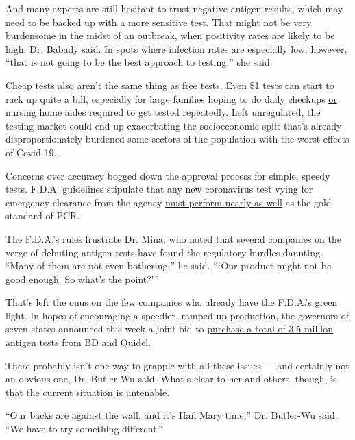 And many experts are still hesitant to trust negative antigen results,
which may need to be backed up with a more sensitive test. That might
not be very burdensome in the midst of an outbreak, when positivity
rates are likely to be high, Dr. Babady said. In spots where infection
rates are especially low, however, ``that is not going to be the best
approach to testing,'' she said.

Cheap tests also aren't the same thing as free tests. Even \$1 tests can
start to rack up quite a bill, especially for large families hoping to
do daily checkups
\href{https://www.nytimes3xbfgragh.onion/2020/06/09/health/testing-coronavirus-nursing-homes-workers.html}{or
nursing home aides required to get tested repeatedly.} Left unregulated,
the testing market could end up exacerbating the socioeconomic split
that's already disproportionately burdened some sectors of the
population with the worst effects of Covid-19.

Concerns over accuracy bogged down the approval process for simple,
speedy tests. F.D.A. guidelines stipulate that any new coronavirus test
vying for emergency clearance from the agency
\href{https://www.fda.gov/news-events/press-announcements/coronavirus-covid-19-update-fda-posts-new-template-home-and-over-counter-diagnostic-tests-use-non}{must
perform nearly as well} as the gold standard of PCR.

The F.D.A.'s rules frustrate Dr. Mina, who noted that several companies
on the verge of debuting antigen tests have found the regulatory hurdles
daunting. ``Many of them are not even bothering,'' he said. ```Our
product might not be good enough. So what's the point?'''

That's left the onus on the few companies who already have the F.D.A.'s
green light. In hopes of encouraging a speedier, ramped up production,
the governors of seven states announced this week a joint bid to
\href{https://governor.maryland.gov/2020/08/04/governors-of-maryland-louisiana-massachusetts-michigan-ohio-and-virginia-announce-major-bipartisan-interstate-compact-for-three-million-rapid-antigen-tests/}{purchase
a total of 3.5 million antigen tests from BD and Quidel}.

There probably isn't one way to grapple with all these issues --- and
certainly not an obvious one, Dr. Butler-Wu said. What's clear to her
and others, though, is that the current situation is untenable.

``Our backs are against the wall, and it's Hail Mary time,'' Dr.
Butler-Wu said. ``We have to try something different.''

